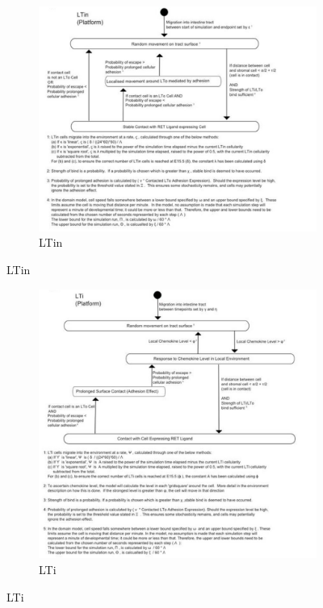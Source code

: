 \documentclass{UoYCSproject}
\begin{document}
\begin{figure}[htp]
\centering
\begin{subfigure}{0.95\textwidth}
\centering
\includegraphics[width=\textwidth]{Appendix/Models/Platform/LTin}
\caption{LTin}
\end{subfigure}
\end{figure}

\begin{figure}[htp]\ContinuedFloat
\centering
\begin{subfigure}{0.95\textwidth}
\centering
\includegraphics[width=\textwidth]{Appendix/Models/Platform/LTi}
\caption{LTi}
\end{subfigure}
\end{figure}
\end{document}
